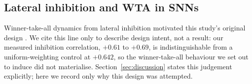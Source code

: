 \subsection{Lateral inhibition and WTA in SNNs}
Winner-take-all dynamics from lateral inhibition motivated this study's
original design \cite{cheng2020lisnn}. We cite this line only to describe
design intent, not a result: our measured inhibition correlation, $+0.61$ to
$+0.69$, is indistinguishable from a uniform-weighting control at $+0.642$,
so the winner-take-all behaviour we set out to induce did not materialise.
Section~\ref{sec:discussion} states this judgement explicitly; here we record
only why this design was attempted.
